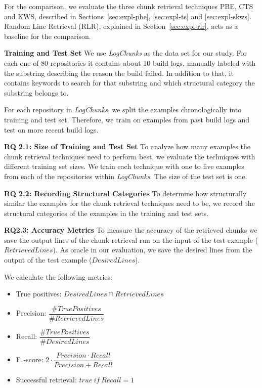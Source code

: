 For the comparison, we evaluate the three chunk retrieval techniques PBE, CTS and KWS, described in Sections~\ref{sec:expl-pbe}, \ref{sec:expl-ts} and \ref{sec:expl-skws}.
Random Line Retrieval (RLR), explained in Section~\ref{sec:expl-rlr}, acts as a baseline for the comparison.

\noindent
\textbf{Training and Test Set}
We use \emph{LogChunks} as the data set for our study.
For each one of 80 repositories it contains about 10 build logs, manually labeled with the substring describing the reason the build failed.
In addition to that, it contains keywords to search for that substring and which structural category the substring belongs to.

For each repository in \emph{LogChunks}, we split the examples chronologically into training and test set.
Therefore, we train on examples from past build logs and test on more recent build logs.

\noindent
\textbf{RQ 2.1: Size of Training and Test Set}
To analyze how many examples the chunk retrieval techniques need to perform best, we evaluate the techniques with different training set sizes.
We train each technique with one to five examples from each of the repositories within \emph{LogChunks}.
The size of the test set is one.

\noindent
\textbf{RQ 2.2: Recording Structural Categories}
To determine how structurally similar the examples for the chunk retrieval techniques need to be, we record the structural categories of the examples in the training and test sets.

\noindent
\textbf{RQ2.3: Accuracy Metrics}
To measure the accuracy of the retrieved chunks we save the output lines of the chunk retrieval run on the input of the test example ($\mathit{RetrievedLines}$).
As oracle in our evaluation, we save the desired lines from the output of the test example ($\mathit{DesiredLines}$).

We calculate the following metrics:
\begin{itemize}
	 \itemsep0.75em
	\item True positives: $\mathit{DesiredLines} \cap \mathit{RetrievedLines}$
	\item Precision: $\dfrac{\# \mathit{TruePositives}}{\# \mathit{RetrievedLines}}$
	\item Recall: $\dfrac{\# \mathit{TruePositives}}{\# \mathit{DesiredLines}}$
	\item F$_{1}$-score: $2 \cdot \dfrac{\mathit{Precision} \cdot \mathit{Recall}}{\mathit{Precision} + \mathit{Recall}}$
	\item Successful retrieval: $\mathit{true}\ \mathit{if}\ \mathit{Recall} = 1$
\end{itemize}

